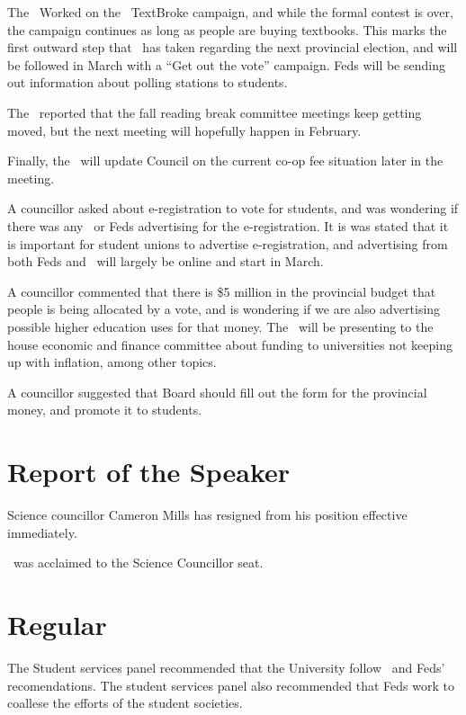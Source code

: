 \begin{information}
    
    The \vpi\ Worked on the \ousa\ TextBroke campaign, and while the formal 
    contest is over, the campaign continues as long as people are buying 
    textbooks. This marks the first outward step that \ousa\ has taken 
    regarding the next provincial election, and will be followed in March
    with a ``Get out the vote'' campaign. Feds will be sending out information
    about polling stations to students. 

    The \vpi\ reported that the fall reading break committee meetings keep 
    getting moved, but the next meeting will hopefully happen in February. 

    Finally, the \vpi\ will update Council on the current co-op fee situation
    later in the meeting.

    A councillor asked about e-registration to vote for students, and was
    wondering if there was any \ousa\ or Feds advertising for the
    e-registration. It is was stated that it is important for student unions to
    advertise e-registration, and advertising from both Feds and \ousa\ will
    largely be online and start in March.

    A councillor commented that there is \$5 million in the provincial budget 
    that people is being allocated by a vote, and is wondering if we are also
    advertising possible higher education uses for that money. The \vpe\ will
    be presenting to the house economic and finance committee about funding to
    universities not keeping up with inflation, among other topics. 

    A councillor suggested that Board should fill out the form for the
    provincial money, and promote it to students.

\end{information}

\section*{Report of the Speaker}

Science councillor Cameron Mills has resigned from his position effective
immediately. 

\tianqi\ was acclaimed to the Science Councillor seat.

\section*{Regular}
\begin{information}
    The Student services panel recommended that the University follow \ousa\
    and Feds' recomendations. The student services panel also recommended that
    Feds work to coallese the efforts of the student societies. 
\end{information}

